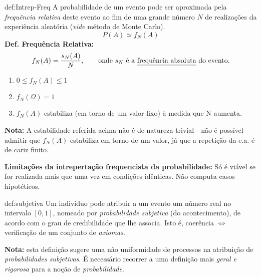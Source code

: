 \begin{theo}{def:Intrep-Freq}\label{def:Intrep-Freq}
    A probabilidade de um evento pode ser aproximada pela \textit{frequência relativa} deste evento ao fim de uma grande número $N$ de realizações da experiência aleatória (\textit{vide} método de Monte Carlo).
    $$
        P(A) \simeq f_N(A)
    $$
    \textbf{Def. Frequência Relativa:}
    $$
        f_N(A) = \dfrac{s_N(A)}{N},\qquad \text{onde $s_N$ é a \underline{frequência absoluta} do evento.}
    $$

    \vspace{-1 em}
    \begin{enumerate}[label=$\bullet$]
        \item $0 \leq f_N(A) \leq 1$
        \item $f_N(\Omega) = 1$
        \item $f_N(A)$ estabiliza (em torno de um valor fixo) à medida que N aumenta.
    \end{enumerate}

    \noindent \textbf{Nota:} A estabilidade referida acima não é de natureza trivial---não é possível admitir que $f_N(A)$ estabiliza em torno de um valor, já que a repetição da e.a. é de cariz finito.\footnotemark[2]
\end{theo}


\noindent \textbf{Limitações da intrepertação frequencista da probabilidade:} Só é viável se for realizada mais que uma vez em condições idênticas. Não computa casos hipotéticos.

\begin{theo}{def:subjetiva}\label{def:subjetiva}
    Um indivíduo pode atribuir a um evento um número real no intervalo $[0,1]$, nomeado por \textit{probabilidade subjetiva} (do acontecimento), de acordo com o grau de credibilidade que lhe associa. Isto é, coerência $\iff$ verificação de um conjunto de \textit{axiomas}.

    \vspace{1 em}
    \noindent \textbf{Nota:} esta definição sugere uma não uniformidade de processos na atribuição de \textit{probabilidades subjetivas}. É necessário recorrer a uma definição mais \textit{geral e rigorosa} para a noção de \textit{probabilidade}.
\end{theo}

